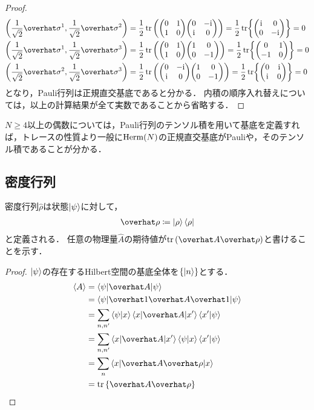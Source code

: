 \documentclass{report}
\begin{document}
\begin{proof}
\begin{align}
        \qty(\frac{1}{\sqrt{2}}\hat{\sigma}^1, \frac{1}{\sqrt{2}}\hat{\sigma}^2) &= \frac{1}{2}\tr\qty(\mqty(0 & 1 \\ 1 & 0)\mqty(0 & -\i \\ \i & 0)) = \frac{1}{2}\tr{\mqty(\i & 0 \\ 0 & -\i)} = 0 \\ 
        \qty(\frac{1}{\sqrt{2}}\hat{\sigma}^1, \frac{1}{\sqrt{2}}\hat{\sigma}^3) &= \frac{1}{2}\tr\qty(\mqty(0 & 1 \\ 1 & 0)\mqty(1 & 0 \\ 0 & -1)) = \frac{1}{2}\tr{\mqty(0 & 1 \\ -1 & 0)} = 0 \\ 
        \qty(\frac{1}{\sqrt{2}}\hat{\sigma}^2, \frac{1}{\sqrt{2}}\hat{\sigma}^3) &= \frac{1}{2}\tr\qty(\mqty(0 & -\i \\ \i & 0)\mqty(1 & 0 \\ 0 & -1)) = \frac{1}{2}\tr{\mqty(0 & \i \\ \i & 0)} = 0 
      \end{align}
      となり，Pauli行列は正規直交基底であると分かる．
      内積の順序入れ替えについては，以上の計算結果が全て実数であることから省略する．
    \end{proof}
    $N \geq 4$以上の偶数については，Pauli行列のテンソル積を用いて基底を定義すれば，トレースの性質より一般に$\mathrm{Herm}(N)$の正規直交基底がPauliや，そのテンソル積であることが分かる．
  \subsection{密度行列}
    密度行列$\hat{\rho}$は状態$\ket{\psi}$に対して，
    \begin{align}
      \hat{\rho} \coloneqq \ket{\rho}\bra{\rho}
    \end{align}
    と定義される．
    任意の物理量$\hat{A}$の期待値が$\tr\qty(\hat{A}\hat{\rho})$と書けることを示す．
    \begin{proof}
      $\ket{\psi}$の存在するHilbert空間の基底全体を$\qty{\ket{n}}$とする．
      \begin{align}
        \ev{A} &= \mel**{\psi}{\hat{A}}{\psi} \\ 
        &= \mel**{\psi}{\hat{1}\hat{A}\hat{1}}{\psi} \\ 
        &= \sum_{n, n'} \braket{\psi}{x}\mel**{x}{\hat{A}}{x'}\braket{x'}{\psi} \\ 
        &= \sum_{n, n'} \mel**{x}{\hat{A}}{x'} \braket{\psi}{x}\braket{x'}{\psi} \\ 
        &= \sum_{n} \mel**{x}{\hat{A}\hat{\rho}}{x} \\ 
        &= \tr\qty{\hat{A}\hat{\rho}}\label{expatation-value-density-matrix}
      \end{align}
    \end{proof}
\end{document}
